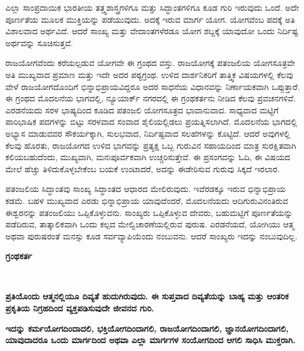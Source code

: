 \vskip 5pt

ಎಲ್ಲಾ ಸಾಂಪ್ರದಾಯಿಕ ಭಾರತೀಯ ತತ್ತ್ವಶಾಸ್ತ್ರಗಳಿಗೂ ಮತ್ತು ಸಿದ್ಧಾಂತಗಳಿಗೂ ಕೂಡ ಗುರಿ ಇರುವುದು ಒಂದೆ. ಅದೇ ಪೂರ್ಣತೆಯ ಮೂಲಕ ಮುಕ್ತಿಯನ್ನು ಪಡೆಯುವುದು. ಅದಕ್ಕೆ ಇರುವ ಮಾರ್ಗ ಯೋಗ. ಯೋಗವೆಂಬ ಪದಕ್ಕೆ ಅತಿ ವಿಶಾಲವಾದ ಅರ್ಥವಿದೆ. ಆದರೆ ಸಾಂಖ್ಯ ಮತ್ತು ವೇದಾಂತಗಳೆರಡೂ ಯೋಗ ಶಬ್ದಕ್ಕೆ ಯಾವುದೋ ಒಂದು ನಿರ್ದಿಷ್ಟ ಅರ್ಥವನ್ನು ಸೂಚಿಸುತ್ತವೆ.

\vskip 5pt

ರಾಜಯೋಗವೆಂದು ಕರೆಯಲ್ಪಡುವ ಯೋಗವೇ ಈ ಗ್ರಂಥದ ವಸ್ತು. ರಾಜಯೋಗಕ್ಕೆ ಪತಂಜಲಿಯ ಯೋಗಸೂತ್ರವೇ ಅತಿ ಮುಖ್ಯವಾದ ಪ್ರಮಾಣ ಮತ್ತು ಇದೇ ಅದರ ಪಠ್ಯಗ್ರಂಥ. ಉಳಿದ ದಾರ್ಶನಿಕರಿಗೆ ತಾತ್ತ್ವಿಕ ವಿಷಯಗಳಲ್ಲಿ ಕೆಲವು ವೇಳೆ ರಾಜಯೋಗದೊಂದಿಗೆ ಭಿನ್ನಾಭಿಪ್ರಾಯವಿದ್ದರೂ ಅದರ ಸಾಧನೆಯ ವಿಧಾನವನ್ನು ನಿರ್ಣಾಯಕವಾಗಿ ಒಪ್ಪುತ್ತಾರೆ. ಈ ಗ್ರಂಥದ ಮೊದಲನೆಯ ಭಾಗದಲ್ಲಿ, ನ್ಯೂಯಾರ್ಕ್​ ನಗರದಲ್ಲಿ ಈ ಗ್ರಂಥಕರ್ತನು ನೀಡಿದ ಕೆಲವು ಪ್ರವಚನಗಳಿವೆ. ಎರಡನೆಯದು ಸರಳ ಭಾಷ್ಯದಿಂದ ಕೂಡಿದ ಪತಂಜಲಿ ಯೋಗಸೂತ್ರದ ಭಾವಾನುವಾದ. ಸಾಧ್ಯವಾದ ಮಟ್ಟಿಗೆ ಪಾರಿಭಾಷಿಕ ಪದಗಳನ್ನು ಬಿಟ್ಟು ಸರಳವಾದ ಸಂವಾದ ಶೈಲಿಯಲ್ಲಿಡಲು ಪ್ರಯತ್ನಿಸಲಾಗಿದೆ. ಮೊದಲನೆಯ ಭಾಗದಲ್ಲಿ ಅಭ್ಯಾಸ ಮಾಡುವವರ ಸೌಕರ್ಯಕ್ಕಾಗಿ, ಸುಲಭವಾದ, ನಿರ್ದಿಷ್ಟವಾದ ಸಲಹೆಗಳನ್ನು ಕೊಟ್ಟಿದೆ. ಆದರೆ ಅವುಗಳಲ್ಲಿ ಕೆಲವು ಹೊರತು, ರಾಜಯೋಗದ ಉಳಿದ ಭಾಗವನ್ನು ಪ್ರತ್ಯಕ್ಷ ಒಬ್ಬ ಗುರುವಿನ ಸಹಾಯದಿಂದ ಮಾತ್ರ ಸುರಕ್ಷಿತವಾಗಿ ಕಲಿಯಬಹುದೆಂದು, ಮುಖ್ಯವಾಗಿ, ಮನಃಪೂರ್ವಕವಾಗಿ ಉಚ್ಚರಿಸುತ್ತೇವೆ. ಈ ಪ್ರಸಂಗವನ್ನು ಓದಿ, ಈ ವಿಷಯದ ಮೇಲೆ ಹೆಚ್ಚು ತಿಳಿದುಕೊಳ್ಳಬೇಕೆಂಬ ಬಯಕೆ ಉಂಟಾದರೆ, ಅದನ್ನು ಈಡೇರಿಸುವ ಗುರುವು ಸಿಕ್ಕದೆ ಇರಲಾರ.

ಪತಂಜಲಿಯ ಸಿದ್ಧಾಂತವು ಸಾಂಖ್ಯ ಸಿದ್ಧಾಂತದ ಆಧಾರದ ಮೇಲಿರುವುದು. ಇವೆರಡಕ್ಕೂ ಇರುವ ಭಿನ್ನಾಭಿಪ್ರಾಯ ಕಡಮೆ. ಬಹಳ ಮುಖ್ಯವಾದ ಎರಡು ಭಿನ್ನಾಭಿಪ್ರಾಯ ಯಾವುದೆಂದರೆ, ಮೊದಲನೆಯದು ಆದಿಗುರುವಿನಂತಿರುವ ಈಶ್ವರನನ್ನು ಪತಂಜಲಿಯು ಒಪ್ಪಿಕೊಳ್ಳುವನು. ಸಾಂಖ್ಯರು ಒಪ್ಪಿಕೊಳ್ಳುವ ದೇವರು, ಬಹುಮಟ್ಟಿಗೆ ಪೂರ್ಣತೆಯನ್ನು ಪಡೆದಿರುವ, ತಾತ್ಕಾಲಿಕವಾಗಿ ಒಂದು ಕಲ್ಪದ ಮೇಲ್ವಿಚಾರಣೆಯಲ್ಲಿರುವ ಪುರುಷ. ಎರಡನೆಯದೆ, ಯೋಗಿಯು ಆತ್ಮ ಅಥವಾ ಪುರುಷರಂತೆ ಮನಸ್ಸು ಕೂಡ ಸರ್ವವ್ಯಾಪಿಯೆಂದು ನಂಬುವನು. ಆದರೆ ಸಾಂಖ್ಯರು ಇದನ್ನು ನಂಬುವುದಿಲ್ಲ.

\begin{flushright}
\textbf{ಗ್ರಂಥಕರ್ತ}
\end{flushright}

\newpage

\thispagestyle{empty}

~

\vfill
\vskip 5cm


\begin{center}
\textbf{ಪ್ರತಿಯೊಂದು ಆತ್ಮನಲ್ಲಿಯೂ ದಿವ್ಯತೆ ಹುದುಗಿರುವುದು. ಈ ಸುಪ್ತವಾದ ದಿವ್ಯತೆಯನ್ನು ಬಾಹ್ಯ ಮತ್ತು ಆಂತರಿಕ ಪ್ರಕೃತಿಯ ನಿಗ್ರಹದಿಂದ ವ್ಯಕ್ತಪಡಿಸುವುದೇ ಜೀವನದ ಗುರಿ.}
\end{center}

\begin{center}
\textbf{ಇದನ್ನು ಕರ್ಮಯೋಗದಿಂದಾದಲಿ, ಭಕ್ತಿಯೋಗದಿಂದಾಗಲಿ, ರಾಜಯೋಗದಿಂದಾಗಲಿ, ಜ್ಞಾನಯೋಗದಿಂದಾಗಲಿ, ಯಾವುದಾದರೂ ಒಂದು ಮಾರ್ಗದಿಂದ ಅಥವಾ ಎಲ್ಲಾ ಮಾರ್ಗಗಳ ಸಂಯೋಗದಿಂದ ಆಗಲಿ ಸಾಧಿಸಿ ಮುಕ್ತರಾಗಿ.}
\end{center}

